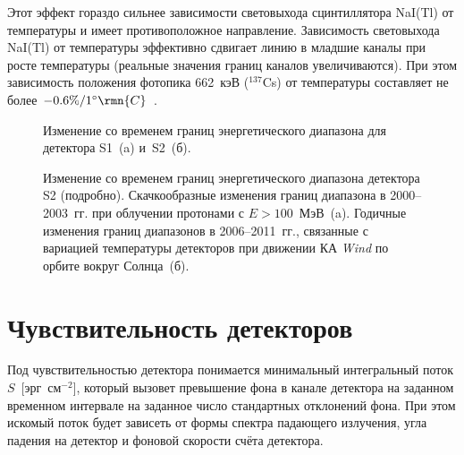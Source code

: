 Этот эффект гораздо сильнее зависимости световыхода сцинтиллятора NaI(Tl) 
от температуры и имеет противоположное направление. Зависимость световыхода NaI(Tl) от 
температуры эффективно сдвигает линию в младшие каналы при росте температуры 
(реальные значения границ каналов увеличиваются). При этом зависимость положения 
фотопика 662~кэВ ($^{137}$Cs) от температуры составляет 
не более~$-0.6\textrm{\%}/1^{\circ}\rmn{C}$~\citep{Ianakiev_2009NIMP}.

\begin{figure}[h]
  \begin{minipage}[h]{0.5\textwidth}
  \end{minipage}
  \hfill
  \begin{minipage}[h]{0.5\textwidth}
  \end{minipage}
  \caption[Изменение со временем границ энергетического диапазона для детектора S1 и~S2.]
  {Изменение со временем границ энергетического диапазона для детектора S1~(a) и~S2~(б).}
  \label{img:KW_E_boundaries}  
\end{figure}

\begin{figure}[h]
  \begin{minipage}[h]{0.5\textwidth}
  \end{minipage}
  \hfill
  \begin{minipage}[h]{0.5\textwidth}
  \end{minipage}
  \caption[Изменение со временем границ энергетического диапазона детектора S2 
  в 2000--2003~гг. и 2006--2011~гг.]
  {Изменение со временем границ энергетического диапазона детектора S2 (подробно). 
  Скачкообразные изменения границ диапазона в 2000--2003~гг. при облучении протонами с $E>100$~МэВ~(a). 
  Годичные изменения границ диапазонов в 2006--2011~гг., связанные с вариацией температуры детекторов 
  при движении КА \textit{Wind} по орбите вокруг Солнца~(б).}
  \label{img:KW_E_boundaries_features}  
\end{figure}

\section{Чувствительность детекторов}
Под чувствительностью детектора понимается минимальный интегральный поток $S$~[эрг~см$^{-2}$], 
который вызовет превышение фона в канале детектора на заданном временном интервале 
на заданное число стандартных отклонений фона. При этом искомый поток будет зависеть 
от формы спектра падающего излучения, угла падения на детектор и фоновой скорости счёта детектора.

